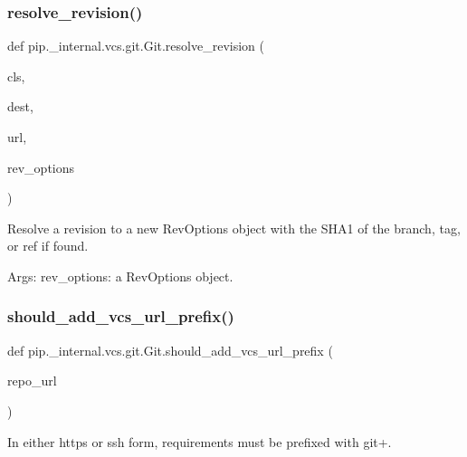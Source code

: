 \subsubsection{\texorpdfstring{resolve\+\_\+revision()}{resolve\_revision()}}
{\footnotesize\ttfamily def pip.\+\_\+internal.\+vcs.\+git.\+Git.\+resolve\+\_\+revision (\begin{DoxyParamCaption}\item[{}]{cls,  }\item[{}]{dest,  }\item[{}]{url,  }\item[{}]{rev\+\_\+options }\end{DoxyParamCaption})}

\begin{DoxyVerb}Resolve a revision to a new RevOptions object with the SHA1 of the
branch, tag, or ref if found.

Args:
  rev_options: a RevOptions object.
\end{DoxyVerb}
 \mbox{\label{classpip_1_1__internal_1_1vcs_1_1git_1_1Git_a8cda8f1d82024ac4a9c878f02b90ccda}} 
\subsubsection{\texorpdfstring{should\+\_\+add\+\_\+vcs\+\_\+url\+\_\+prefix()}{should\_add\_vcs\_url\_prefix()}}
{\footnotesize\ttfamily def pip.\+\_\+internal.\+vcs.\+git.\+Git.\+should\+\_\+add\+\_\+vcs\+\_\+url\+\_\+prefix (\begin{DoxyParamCaption}\item[{}]{repo\+\_\+url }\end{DoxyParamCaption})\hspace{0.3cm}{\ttfamily [static]}}

\begin{DoxyVerb}In either https or ssh form, requirements must be prefixed with git+.
\end{DoxyVerb}
 \mbox{\label{classpip_1_1__internal_1_1vcs_1_1git_1_1Git_a1816a618d6e7254c4588e3c9be3a60a2}} 
